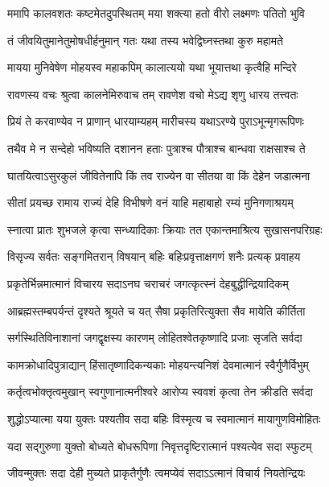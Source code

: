 \twolineshloka
{ममापि कालवशतः कष्टमेतदुपस्थितम्}
{मया शक्त्या हतो वीरो लक्ष्मणः पतितो भुवि} %

\twolineshloka
{तं जीवयितुमानेतुमोषधीर्हनुमान् गतः}
{यथा तस्य भवेद्विघ्नस्तथा कुरु महामते} %

\twolineshloka
{मायया मुनिवेषेण मोहयस्व महाकपिम्}
{कालात्ययो यथा भूयात्तथा कृत्वैहि मन्दिरे} %

\twolineshloka
{रावणस्य वचः श्रुत्वा कालनेमिरुवाच तम्}
{रावणेश वचो मेऽद्य शृणु धारय तत्त्वतः} %

\twolineshloka
{प्रियं ते करवाण्येव न प्राणान् धारयाम्यहम्}
{मारीचस्य यथाऽरण्ये पुराऽभून्मृगरूपिणः} %

\twolineshloka
{तथैव मे न सन्देहो भविष्यति दशानन}
{हताः पुत्राश्च पौत्राश्च बान्धवा राक्षसाश्च ते} %

\twolineshloka
{घातयित्वाऽसुरकुलं जीवितेनापि किं तव}
{राज्येन वा सीतया वा किं देहेन जडात्मना} %

\twolineshloka
{सीतां प्रयच्छ रामाय राज्यं देहि विभीषणे}
{वनं याहि महाबाहो रम्यं मुनिगणाश्रयम्} %

\twolineshloka
{स्नात्वा प्रातः शुभजले कृत्वा सन्ध्यादिकाः क्रियाः}
{तत एकान्तमाश्रित्य सुखासनपरिग्रहः} %

\twolineshloka
{विसृज्य सर्वतः सङ्गमितरान् विषयान् बहिः}
{बहिःप्रवृत्ताक्षगणं शनैः प्रत्यक् प्रवाहय} %

\twolineshloka
{प्रकृतेर्भिन्नमात्मानं विचारय सदाऽनघ}
{चराचरं जगत्कृत्स्नं देहबुद्धीन्द्रियादिकम्} %

\twolineshloka
{आब्रह्मस्तम्बपर्यन्तं दृश्यते श्रूयते च यत्}
{सैषा प्रकृतिरित्युक्ता सैव मायेति कीर्तिता} %

\twolineshloka
{सर्गस्थितिविनाशानां जगद्वृक्षस्य कारणम्}
{लोहितश्वेतकृष्णादि प्रजाः सृजति सर्वदा} %

\twolineshloka
{कामक्रोधादिपुत्राद्यान् हिंसातृष्णादिकन्यकाः}
{मोहयन्त्यनिशं देवमात्मानं स्वैर्गुणैर्विभुम्} %

\twolineshloka
{कर्तृत्वभोक्तृत्वमुखान् स्वगुणानात्मनीश्वरे}
{आरोप्य स्ववशं कृत्वा तेन क्रीडति सर्वदा} %

\twolineshloka
{शुद्धोऽप्यात्मा यया युक्तः पश्यतीव सदा बहिः}
{विस्मृत्य च स्वमात्मानं मायागुणविमोहितः} %

\twolineshloka
{यदा सद्गुरुणा युक्तो बोध्यते बोधरूपिणा}
{निवृत्तदृष्टिरात्मानं पश्यत्येव सदा स्फुटम्} %

\twolineshloka
{जीवन्मुक्तः सदा देही मुच्यते प्राकृतैर्गुणैः}
{त्वमप्येवं सदाऽऽत्मानं विचार्य नियतेन्द्रियः} %

